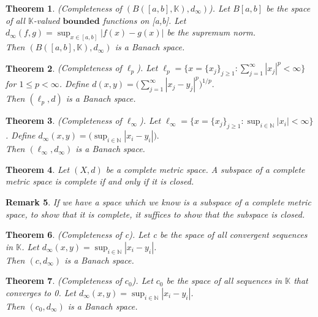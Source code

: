 \documentclass[twoside]{article}
\newcounter{lecnum}
\newtheorem{theorem}{Theorem}[lecnum]
\newtheorem{remark}[theorem]{Remark}
\begin{document}
\begin{theorem}(Completeness of $(B([a,b],\mathbb{K}),d_{\infty})$). Let $B[a,b]$ be the space of all $\mathbb{K}$-valued $\textbf{bounded}$ functions on [a,b]. Let $d_{\infty}(f,g) = \sup_{x \in [a,b]}|f(x) - g(x)|$ be the supremum norm.\\ Then $(B([a,b],\mathbb{K}),d_{\infty})$ is a Banach space.
\end{theorem}

\begin{theorem}(Completeness of $\ell_p$). Let $\ell_p = \{x = \{x_j\}_{j \geq 1}: \sum_{j=1}^{\infty}|x_j|^p < \infty\}$ for $1 \leq p < \infty$. Define $d(x,y) = \bigg( \sum_{j=1}^{\infty}|x_j-y_j|^p \bigg)^{1/p}.$\\ Then $(\ell_p, d)$ is a Banach space.
\end{theorem}

\begin{theorem}(Completeness of $\ell_{\infty}$). Let $\ell_{\infty} = \{x = \{x_j\}_{j \geq 1}: \sup_{i \in \mathbb{N}}|x_i| < \infty\}$. Define $d_{\infty}(x,y) = \bigg( \sup_{i \in \mathbb{N}}|x_i - y_i| \bigg).$\\ Then $(\ell_{\infty}, d_{\infty})$ is a Banach space.
\end{theorem}


\begin{theorem} Let $(X, d)$ be a complete metric space. A subspace of a complete metric space is complete if and only if it is closed.
\end{theorem}
\begin{remark}If we have a space which we know is a subspace of a complete metric space, to show that it is complete, it suffices to show that the subspace is closed.
\end{remark}

\begin{theorem}(Completeness of c). Let c be the space of all convergent sequences in $\mathbb{K}$. Let $d_{\infty}(x,y) = \sup_{i \in \mathbb{N}}|x_i - y_i|$.\\ Then $(c, d_{\infty})$ is a Banach space.
\end{theorem}

\begin{theorem}(Completeness of $c_0$). Let $c_0$ be the space of all sequences in $\mathbb{K}$ that converges to 0. Let $d_{\infty}(x,y) = \sup_{i \in \mathbb{N}}|x_i - y_i|$.\\ Then $(c_0, d_{\infty})$ is a Banach space.
\end{theorem}
\end{document}
